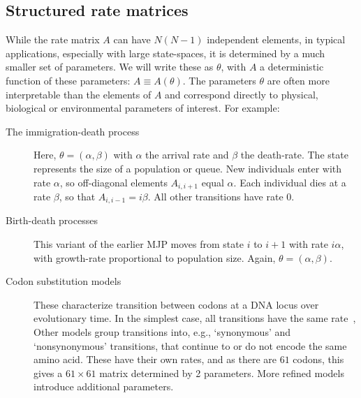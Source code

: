 \subsection{Structured rate matrices}
While the rate matrix $A$ can have $N(N-1)$ independent elements,
in typical applications, especially with large state-spaces, 
it is determined by a much smaller
set of parameters. We will write these as $\theta$, with
$A$ a deterministic function of these parameters: 
$A \equiv A(\theta)$. The parameters $\theta$ are often more 
interpretable than the elements of $A$ and correspond directly to
physical, biological or environmental parameters of interest. 
For example:
\begin{description}
  \item[The immigration-death process] Here, $\theta = (\alpha,\beta)$
    with $\alpha$ the arrival rate and $\beta$ the death-rate.
    The state represents the size of a 
    population or queue. New individuals
    enter with rate $\alpha$,
    so off-diagonal elements $A_{i,i+1}$ equal $\alpha$.
    Each individual dies %
    at a rate $\beta$, so that %
    $A_{i,i-1}=i\beta$.
    All other transitions have rate $0$. 
  \item[Birth-death processes] This variant of the
    earlier MJP moves from state $i$ 
    to $i+1$ with rate $i\alpha$, with growth-rate proportional to 
    population size. Again, 
    $\theta=(\alpha,\beta)$.
  \item[Codon substitution models] These %
    characterize transition between codons at a 
    DNA locus %
    over evolutionary time. In the simplest case,
    all transitions have the same rate~\cite{jukescantor69}, 
    Other models group transitions 
    into, e.g., `synonymous' and `nonsynonymous' transitions, 
    that continue to or do not encode the same amino acid. 
    These have their own rates, and as 
    there are $61$ codons, this gives a 
    $61\times 61$ matrix determined by 2 parameters. More refined 
    models~\cite{goldman1994codon} introduce additional parameters. 
\end{description}
